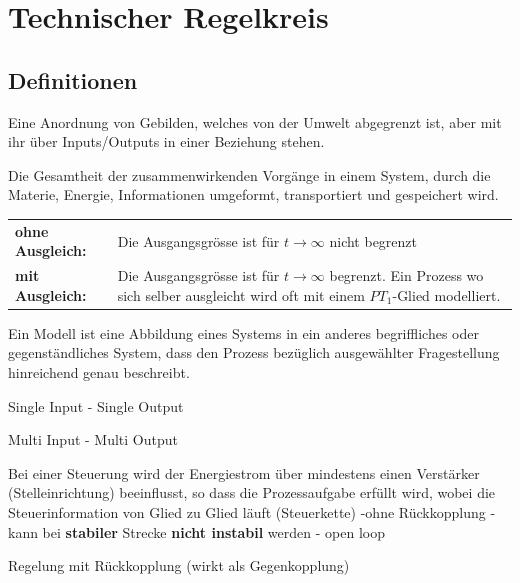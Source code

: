 \section{Technischer Regelkreis}
\subsection{Definitionen }

\begin{description}[leftmargin=2.5cm]
 \item[System]	Eine Anordnung von Gebilden, welches von der Umwelt abgegrenzt ist, aber
								mit ihr über Inputs/Outputs in einer Beziehung stehen.
 \item[Prozess] Die Gesamtheit der zusammenwirkenden Vorgänge in einem System,
        		durch die Materie, Energie, Informationen umgeformt, transportiert und
        		gespeichert wird. \\
        		\begin{tabular}{lp{12cm}}
        		\textbf{ohne Ausgleich:} & Die Ausgangsgrösse ist für $t \rightarrow \infty$ nicht begrenzt \\
        		\textbf{mit Ausgleich:} & Die Ausgangsgrösse ist für $t \rightarrow \infty$ begrenzt. Ein Prozess wo sich selber ausgleicht wird oft mit einem $PT_1$-Glied modelliert.
        		\end{tabular}
 \item[Modell]	Ein Modell ist eine Abbildung eines Systems in ein anderes begriffliches oder
								gegenständliches System, dass den Prozess bezüglich ausgewählter Fragestellung
								hinreichend genau beschreibt.
 \item[SISO] Single Input - Single Output
 \item[MIMO] Multi Input - Multi Output
 \item[Steuerung]	Bei einer Steuerung wird der Energiestrom über mindestens einen Verstärker (Stelleinrichtung)
									beeinflusst, so dass die Prozessaufgabe erfüllt wird, wobei die Steuerinformation
									von Glied zu Glied läuft (Steuerkette) \newline
									-ohne Rückkopplung \newline
									- kann bei \textbf{stabiler} Strecke \textbf{nicht instabil} werden \newline
									- open loop\\
\begin{minipage}{8cm}
 \item[Regelung] mit Rückkopplung (wirkt als Gegenkopplung) \newline

\end{minipage}
\end{description}
